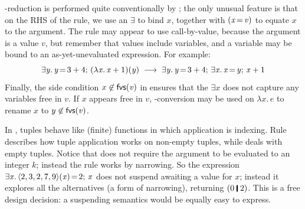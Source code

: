 \documentclass[acmsmall]{acmart}
\newcommand{\Varid}[1]{\mathit{#1}}
\begin{document}
\textbeta-reduction is performed quite conventionally by ; the
only unusual feature is that on the RHS of the rule, we use an \ensuremath{\exists{}} to bind \ensuremath{\Varid{x}},
together with \ensuremath{(\Varid{x}\hspace{-0.14em}=\hspace{-0.14em}\Varid{v})} to equate \ensuremath{\Varid{x}} to the argument.
The rule may appear to use call-by-value, because the argument is a value \ensuremath{\Varid{v}},
but remember that values include variables, and a variable may be bound to an
as-yet-unevaluated expression.  For example:
$$
\ensuremath{\exists\Varid{y}.\,\Varid{y}\hspace{-0.14em}=\hspace{-0.14em}\mathrm{3}\mathbin{+}\mathrm{4};\,(\lambda\Varid{x}.\,\Varid{x}\mathbin{+}\mathrm{1})(\Varid{y})}
\; \movesto \;
\ensuremath{\exists\Varid{y}.\,\Varid{y}\hspace{-0.14em}=\hspace{-0.14em}\mathrm{3}\mathbin{+}\mathrm{4};\,\exists\Varid{x}.\,\Varid{x}\hspace{-0.14em}=\hspace{-0.14em}\Varid{y};\,\Varid{x}\mathbin{+}\mathrm{1}}
$$
Finally, the side condition $x \not\in \freevars{\ensuremath{\Varid{v}}}$ in 
ensures that the $\ensuremath{\exists{}} \ensuremath{\Varid{x}}$
does not capture any variables free in \ensuremath{\Varid{v}}.  If \ensuremath{\Varid{x}} appears free in \ensuremath{\Varid{v}},
\textalpha-conversion may be used on \ensuremath{\lambda\Varid{x}.\,\Varid{e}} to rename \ensuremath{\Varid{x}} to $y \not\in \freevars{\ensuremath{\Varid{v}}}$.

In \versecalc{}, tuples behave like (finite) functions in which application is
indexing.  Rule  describes how tuple application works on non-empty
tuples, while  deals with empty tuples.
Notice that  does not require the argument to be evaluated to an integer $k$; instead
the rule works by narrowing.  So the expression \ensuremath{\exists\Varid{x}.\,\langle{}\mathrm{2},\mathrm{3},\mathrm{2},\mathrm{7},\mathrm{9}\rangle(\Varid{x})\hspace{-0.14em}=\hspace{-0.14em}\mathrm{2};\,\Varid{x}}
does not suspend awaiting a value for \ensuremath{\Varid{x}}; instead it explores all the
alternatives (a form of narrowing), returning \ensuremath{(\mathrm{0}\;\rule[-0.1em]{0.15em}{0.75em}\;\mathrm{2})}.  This is a free design decision:
a suspending semantics would be equally easy to express.
\end{document}
